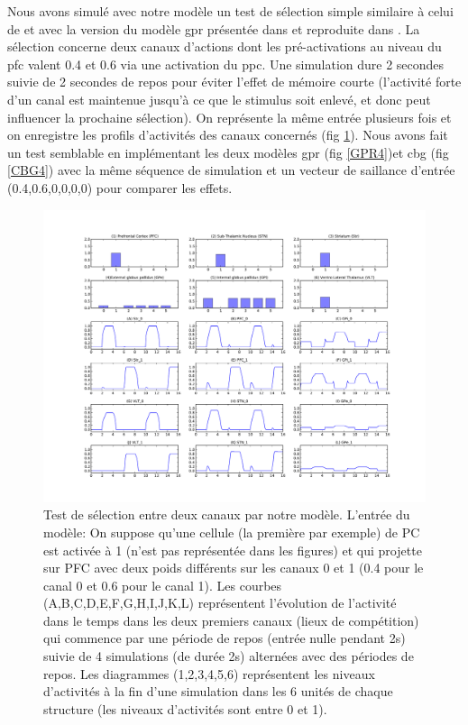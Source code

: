 Nous avons simulé avec notre modèle un test de sélection simple similaire à celui de \cite{Gurney:2001b} et avec la version du modèle \gls{gpr} présentée dans \cite{Prescott:2006} et reproduite dans \cite{Girard:2008}. La sélection concerne deux canaux d'actions dont les pré-activations au niveau du \gls{pfc} valent 0.4 et 0.6 via une activation du \gls{ppc}. Une simulation dure 2 secondes suivie de 2 secondes de repos pour éviter l'effet de mémoire courte (l'activité forte d'un canal est maintenue jusqu'à ce que le stimulus soit enlevé, et donc peut influencer la prochaine sélection). On représente la même entrée plusieurs fois et on enregistre les profils d'activités des canaux concernés (fig \ref{TBG4}). Nous avons fait un test semblable en implémentant les deux modèles \gls{gpr} (fig \ref{GPR4})et \gls{cbg} (fig \ref{CBG4}) avec la même séquence de simulation et un vecteur de saillance d'entrée (0.4,0.6,0,0,0,0) pour comparer les effets.\\
\begin{figure}
\begin{center}
\includegraphics[width=\textwidth]{figures/ch4_8_model_04}
\caption{ Test de sélection entre deux canaux par notre modèle. L'entrée du modèle: On suppose qu'une cellule (la première par exemple) de PC est activée à 1 (n'est pas représentée dans les figures) et qui projette sur PFC avec deux poids différents sur les canaux 0 et 1 (0.4 pour le canal 0 et 0.6 pour le canal 1). Les courbes (A,B,C,D,E,F,G,H,I,J,K,L) représentent l'évolution de l'activité dans le temps dans les deux premiers canaux (lieux de compétition) qui commence par une période de repos (entrée nulle pendant 2s) suivie de 4 simulations (de durée 2s) alternées avec des périodes de repos. Les diagrammes (1,2,3,4,5,6) représentent les niveaux d'activités à la fin d'une simulation dans les 6 unités de chaque structure (les niveaux d'activités sont entre 0 et 1). }
\label{TBG4}
\end{center}
\end{figure}
